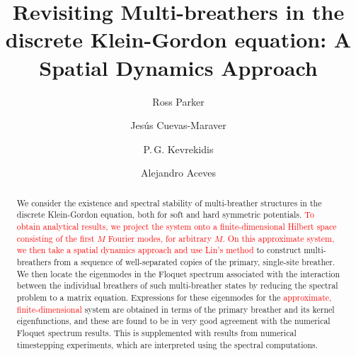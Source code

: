 \documentclass[12pt,reqno]{amsart}
\theoremstyle{definition}
\newcommand{\revised}[1]{ \textcolor{red}{#1} }
\begin{document}
\title[Revisiting Multi-breathers in the discrete Klein-Gordon equation]{Revisiting Multi-breathers in the discrete Klein-Gordon equation: A Spatial Dynamics Approach}

\author{Ross Parker}
\address{Department of Mathematics, Southern Methodist University, 
Dallas, TX 75275, USA}

\author{Jes\'us Cuevas-Maraver}
\address{Grupo de F\'{\i}sica No Lineal, Departamento de F\'{\i}sica Aplicada I,
Universidad de Sevilla. Escuela Polit\'{e}cnica Superior, C/ Virgen de Africa, 7, 41011-Sevilla, Spain}
\address{Instituto de Matem\'{a}ticas de la Universidad de Sevilla (IMUS). Edificio
Celestino Mutis. Avda. Reina Mercedes s/n, 41012-Sevilla, Spain}

\author{P.\,G. Kevrekidis} 
\address{Department of Mathematics and Statistics, University of Massachusetts, Amherst MA 01003, USA}

\author{Alejandro Aceves}
\address{Department of Mathematics, Southern Methodist University, 
Dallas, TX 75275, USA}

\begin{abstract}
	We consider the existence and spectral stability of multi-breather structures in the discrete Klein-Gordon equation, both for soft and hard symmetric potentials. 
	\revised{
	To obtain analytical results, we project the system onto a finite-dimensional Hilbert space consisting of the first $M$ Fourier modes, for arbitrary $M$. On this approximate system, we then take a spatial dynamics approach and use Lin's method
	}
	to construct multi-breathers from a sequence of well-separated copies of the primary, single-site breather. We then locate the eigenmodes in the Floquet spectrum associated with the interaction between the individual breathers of such multi-breather	states by reducing the spectral problem to a matrix equation. Expressions for these eigenmodes for the \revised{approximate, finite-dimensional
	} system are obtained in terms of the primary breather and its kernel eigenfunctions, and these are found to be in very good agreement with the numerical Floquet spectrum results. This is supplemented with results from numerical timestepping experiments, which are interpreted using the spectral computations.
\end{abstract}

\maketitle
\end{document}
